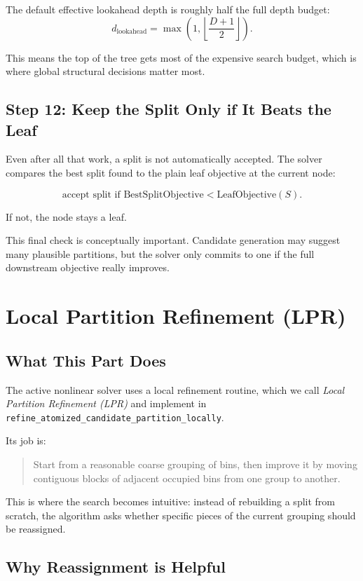 \documentclass[11pt]{article}
\begin{document}
The default effective lookahead depth is roughly half the full depth budget:
\[
d_{\mathrm{lookahead}}
=
\max\left(1, \left\lfloor \frac{D+1}{2} \right\rfloor\right).
\]

This means the top of the tree gets most of the expensive search budget, which is where global structural decisions matter most.

\subsection{Step 12: Keep the Split Only if It Beats the Leaf}

Even after all that work, a split is not automatically accepted. The solver compares the best split found to the plain leaf objective at the current node:

\[
\text{accept split if } \mathrm{BestSplitObjective} < \mathrm{LeafObjective}(S).
\]

If not, the node stays a leaf.

This final check is conceptually important. Candidate generation may suggest many plausible partitions, but the solver only commits to one if the full downstream objective really improves.

\section{Local Partition Refinement (LPR)}

\subsection{What This Part Does}

The active nonlinear solver uses a local refinement routine, which we call \emph{Local Partition Refinement (LPR)} and implement in \texttt{refine\_atomized\_candidate\_partition\_locally}.

Its job is:

\begin{quote}
Start from a reasonable coarse grouping of bins, then improve it by moving contiguous blocks of adjacent occupied bins from one group to another.
\end{quote}

This is where the search becomes intuitive: instead of rebuilding a split from scratch, the algorithm asks whether specific pieces of the current grouping should be reassigned.

\subsection{Why Reassignment is Helpful}
\end{document}
